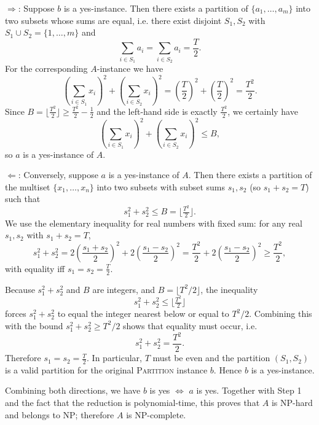 \smallskip

\noindent\(\Rightarrow\): Suppose \(b\) is a yes-instance. Then there exists a partition of \(\{a_1,\dots,a_m\}\) into two subsets whose sums are equal, i.e. there exist disjoint \(S_1,S_2\) with \(S_1\cup S_2=\{1,\dots,m\}\) and
\[
\sum_{i\in S_1} a_i = \sum_{i\in S_2} a_i = \frac{T}{2}.
\]
For the corresponding \(A\)-instance we have
\[
\left(\sum_{i\in S_1} x_i\right)^2 + \left(\sum_{i\in S_2} x_i\right)^2
= \left(\frac{T}{2}\right)^2 + \left(\frac{T}{2}\right)^2
= \frac{T^2}{2}.
\]
Since \(B=\big\lfloor \tfrac{T^2}{2}\big\rfloor \ge \tfrac{T^2}{2}-\tfrac{1}{2}\) and the left-hand side is exactly \(\tfrac{T^2}{2}\), we certainly have
\[
\left(\sum_{i\in S_1} x_i\right)^2 + \left(\sum_{i\in S_2} x_i\right)^2 \le B,
\]
so \(a\) is a yes-instance of \(A\).

\smallskip

\noindent\(\Leftarrow\): Conversely, suppose \(a\) is a yes-instance of \(A\). Then there exists a partition of the multiset \(\{x_1,\dots,x_n\}\) into two subsets with subset sums \(s_1,s_2\) (so \(s_1+s_2=T\)) such that
\[
s_1^2 + s_2^2 \le B = \big\lfloor \tfrac{T^2}{2}\big\rfloor .
\]
We use the elementary inequality for real numbers with fixed sum: for any real \(s_1,s_2\) with \(s_1+s_2=T\),
\[
s_1^2+s_2^2 = 2\left(\frac{s_1+s_2}{2}\right)^2 + 2\left(\frac{s_1-s_2}{2}\right)^2
= \frac{T^2}{2} + 2\left(\frac{s_1-s_2}{2}\right)^2
\ge \frac{T^2}{2},
\]
with equality iff \(s_1=s_2=\tfrac{T}{2}\).

Because \(s_1^2+s_2^2\) and \(B\) are integers, and \(B=\lfloor T^2/2\rfloor\), the inequality
\[
s_1^2+s_2^2 \le \big\lfloor \tfrac{T^2}{2}\big\rfloor
\]
forces \(s_1^2+s_2^2\) to equal the integer nearest below or equal to \(T^2/2\). Combining this with the bound \(s_1^2+s_2^2 \ge T^2/2\) shows that equality must occur, i.e.
\[
s_1^2+s_2^2 = \frac{T^2}{2}.
\]
Therefore \(s_1=s_2=\frac{T}{2}\). In particular, \(T\) must be even and the partition \((S_1,S_2)\) is a valid partition for the original \textsc{Partition} instance \(b\). Hence \(b\) is a yes-instance.

Combining both directions, we have \(b\) is yes \(\iff\) \(a\) is yes. Together with Step 1 and the fact that the reduction is polynomial-time, this proves that \(A\) is NP-hard and belongs to NP; therefore \(A\) is NP-complete.

\newpage